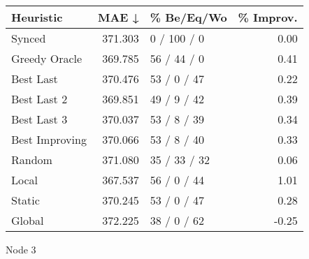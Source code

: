 \begin{tabular}{lrlr}
\toprule
\textbf{Heuristic} & \textbf{MAE ↓} & \textbf{\% Be/Eq/Wo} & \textbf{\% Improv.} \\
\midrule
            Synced &        371.303 &          0 / 100 / 0 &                0.00 \\
     Greedy Oracle &        369.785 &          56 / 44 / 0 &                0.41 \\
         Best Last &        370.476 &          53 / 0 / 47 &                0.22 \\
       Best Last 2 &        369.851 &          49 / 9 / 42 &                0.39 \\
       Best Last 3 &        370.037 &          53 / 8 / 39 &                0.34 \\
    Best Improving &        370.066 &          53 / 8 / 40 &                0.33 \\
            Random &        371.080 &         35 / 33 / 32 &                0.06 \\
             Local &        367.537 &          56 / 0 / 44 &                1.01 \\
            Static &        370.245 &          53 / 0 / 47 &                0.28 \\
            Global &        372.225 &          38 / 0 / 62 &               -0.25 \\
\bottomrule
\end{tabular}
\caption{Node 3}
\label{tab:non_lr01_le2_bs4_3}
